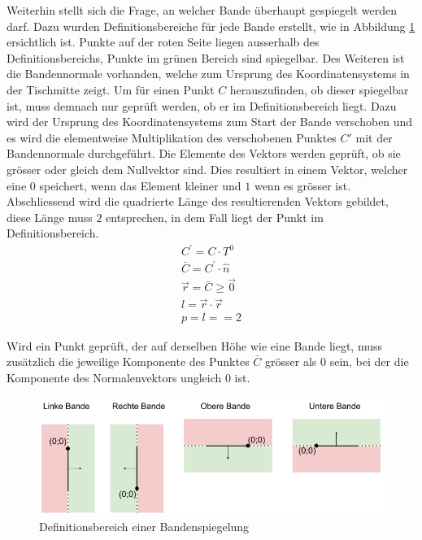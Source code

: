\newpage
Weiterhin stellt sich die Frage, an welcher Bande überhaupt gespiegelt werden darf. Dazu wurden Definitionsbereiche
für jede Bande erstellt, wie in Abbildung \ref{fig:Definitionsbereich_Bandenspiegelung} ersichtlich ist. Punkte auf
der roten Seite liegen ausserhalb des Definitionsbereichs, Punkte im grünen Bereich sind spiegelbar. Des Weiteren
ist die Bandennormale vorhanden, welche zum Ursprung des Koordinatensystems in der Tischmitte zeigt. Um für einen Punkt
$C$ herauszufinden, ob dieser spiegelbar ist, muss demnach nur geprüft werden, ob er im Definitionsbereich liegt.
Dazu wird der Ursprung des Koordinatensystems zum Start der Bande verschoben und es wird die elementweise Multiplikation
des verschobenen Punktes $C'$ mit der Bandennormale durchgeführt.
Die Elemente des Vektors werden geprüft, ob sie grösser oder gleich dem Nullvektor sind.
Dies resultiert in einem Vektor, welcher eine $0$ speichert, wenn das Element kleiner und $1$ wenn es grösser ist.
Abschliessend wird die quadrierte Länge des resultierenden Vektors gebildet, diese Länge muss $2$ entsprechen, in dem
Fall liegt der Punkt im Definitionsbereich.
\begin{align}
    C^{'} = C \cdot T^0\\
    \bar{C} = C^{'} \cdot \hat{n}\\
    \vec{r} = \bar{C} \geq \vec{0}\\
    l = \vec{r} \cdot \vec{r}\\
    p = l == 2
\end{align}

Wird ein Punkt geprüft, der auf derselben Höhe wie eine Bande liegt, muss zusätzlich die jeweilige Komponente des Punktes
$\bar{C}$ grösser als $0$ sein, bei der die Komponente des Normalenvektors ungleich $0$ ist.

\begin{figure}[h!]
    \begin{center}
        \includegraphics[width=1\linewidth]{../common/03_billiard_ai/resources/49_definitionsbereich_spiegelung_bande.png}
    \end{center}
    \caption{Definitionsbereich einer Bandenspiegelung}
    \label{fig:Definitionsbereich_Bandenspiegelung}
\end{figure}

